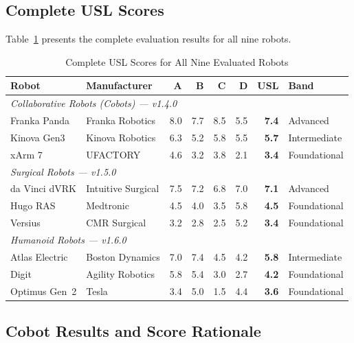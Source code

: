 \documentclass[11pt,a4paper]{article}
\begin{document}
\subsection{Complete USL Scores}
Table~\ref{tab:allscores} presents the complete evaluation results for all nine robots.

\begin{table}[H]
\centering
\caption{Complete USL Scores for All Nine Evaluated Robots}
\label{tab:allscores}
\small
\begin{tabular}{l l r r r r r l}
\toprule
\textbf{Robot} & \textbf{Manufacturer} & \textbf{A} & \textbf{B} & \textbf{C} & \textbf{D} & \textbf{USL} & \textbf{Band} \\
\midrule
\multicolumn{8}{l}{\textit{Collaborative Robots (Cobots) --- v1.4.0}} \\
Franka Panda & Franka Robotics & 8.0 & 7.7 & 8.5 & 5.5 & \textbf{7.4} & Advanced \\
Kinova Gen3 & Kinova Robotics & 6.3 & 5.2 & 5.8 & 5.5 & \textbf{5.7} & Intermediate \\
xArm 7 & UFACTORY & 4.6 & 3.2 & 3.8 & 2.1 & \textbf{3.4} & Foundational \\
\midrule
\multicolumn{8}{l}{\textit{Surgical Robots --- v1.5.0}} \\
da Vinci dVRK & Intuitive Surgical & 7.5 & 7.2 & 6.8 & 7.0 & \textbf{7.1} & Advanced \\
Hugo RAS & Medtronic & 4.5 & 4.0 & 3.5 & 5.8 & \textbf{4.5} & Foundational \\
Versius & CMR Surgical & 3.2 & 2.8 & 2.5 & 5.2 & \textbf{3.4} & Foundational \\
\midrule
\multicolumn{8}{l}{\textit{Humanoid Robots --- v1.6.0}} \\
Atlas Electric & Boston Dynamics & 7.0 & 7.4 & 4.5 & 4.2 & \textbf{5.8} & Intermediate \\
Digit & Agility Robotics & 5.8 & 5.4 & 3.0 & 2.7 & \textbf{4.2} & Foundational \\
Optimus Gen~2 & Tesla & 3.4 & 5.0 & 1.5 & 4.4 & \textbf{3.6} & Foundational \\
\bottomrule
\end{tabular}
\end{table}

\subsection{Cobot Results and Score Rationale}
\end{document}
